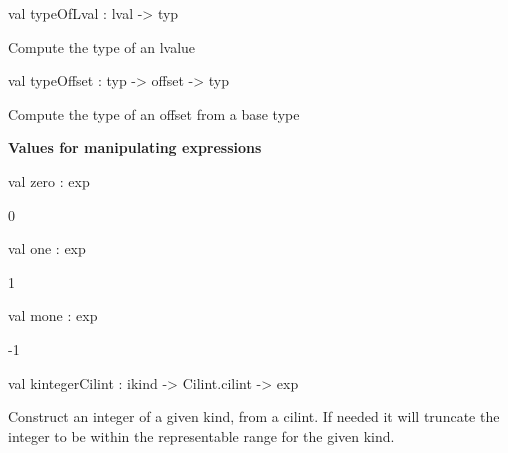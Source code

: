 \documentclass[11pt]{article}
\begin{document}
\label{val:Cil.typeOfLval}\begin{ocamldoccode}
val typeOfLval : lval -> typ
\end{ocamldoccode}
\begin{ocamldocdescription}
Compute the type of an lvalue


\end{ocamldocdescription}




\label{val:Cil.typeOffset}\begin{ocamldoccode}
val typeOffset : typ -> offset -> typ
\end{ocamldoccode}
\begin{ocamldocdescription}
Compute the type of an offset from a base type


\end{ocamldocdescription}




{\bf Values for manipulating expressions}



\label{val:Cil.zero}\begin{ocamldoccode}
val zero : exp
\end{ocamldoccode}
\begin{ocamldocdescription}
0


\end{ocamldocdescription}




\label{val:Cil.one}\begin{ocamldoccode}
val one : exp
\end{ocamldoccode}
\begin{ocamldocdescription}
1


\end{ocamldocdescription}




\label{val:Cil.mone}\begin{ocamldoccode}
val mone : exp
\end{ocamldoccode}
\begin{ocamldocdescription}
-1


\end{ocamldocdescription}




\label{val:Cil.kintegerCilint}\begin{ocamldoccode}
val kintegerCilint : ikind -> Cilint.cilint -> exp
\end{ocamldoccode}
\begin{ocamldocdescription}
Construct an integer of a given kind, from a cilint. If needed it
 will truncate the integer to be within the representable range for
 the given kind.


\end{ocamldocdescription}
\end{document}
